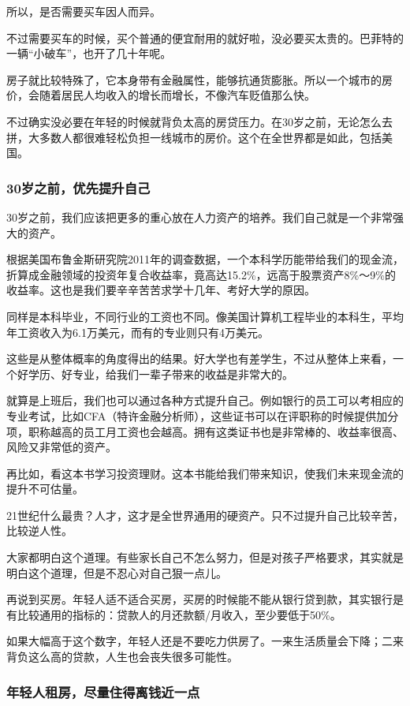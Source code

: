 所以，是否需要买车因人而异。

不过需要买车的时候，买个普通的便宜耐用的就好啦，没必要买太贵的。巴菲特的一辆“小破车”，也开了几十年呢。

房子就比较特殊了，它本身带有金融属性，能够抗通货膨胀。所以一个城市的房价，会随着居民人均收入的增长而增长，不像汽车贬值那么快。

不过确实没必要在年轻的时候就背负太高的房贷压力。在30岁之前，无论怎么去拼，大多数人都很难轻松负担一线城市的房价。这个在全世界都是如此，包括美国。

\subsubsection{30岁之前，优先提升自己}

30岁之前，我们应该把更多的重心放在人力资产的培养。我们自己就是一个非常强大的资产。

根据美国布鲁金斯研究院2011年的调查数据，一个本科学历能带给我们的现金流，折算成金融领域的投资年复合收益率，竟高达15.2\%，远高于股票资产8\%～9\%的收益率。这也是我们要辛辛苦苦求学十几年、考好大学的原因。

同样是本科毕业，不同行业的工资也不同。像美国计算机工程毕业的本科生，平均年工资收入为6.1万美元，而有的专业则只有4万美元。

这些是从整体概率的角度得出的结果。好大学也有差学生，不过从整体上来看，一个好学历、好专业，给我们一辈子带来的收益是非常大的。

就算是上班后，我们也可以通过各种方式提升自己。例如银行的员工可以考相应的专业考试，比如CFA（特许金融分析师），这些证书可以在评职称的时候提供加分项，职称越高的员工月工资也会越高。拥有这类证书也是非常棒的、收益率很高、风险又非常低的资产。

再比如，看这本书学习投资理财。这本书能给我们带来知识，使我们未来现金流的提升不可估量。

21世纪什么最贵？人才，这才是全世界通用的硬资产。只不过提升自己比较辛苦，比较逆人性。

大家都明白这个道理。有些家长自己不怎么努力，但是对孩子严格要求，其实就是明白这个道理，但是不忍心对自己狠一点儿。

再说到买房。年轻人适不适合买房，买房的时候能不能从银行贷到款，其实银行是有比较通用的指标的：贷款人的月还款额/月收入，至少要低于50\%。

如果大幅高于这个数字，年轻人还是不要吃力供房了。一来生活质量会下降；二来背负这么高的贷款，人生也会丧失很多可能性。

\subsubsection{年轻人租房，尽量住得离钱近一点}

